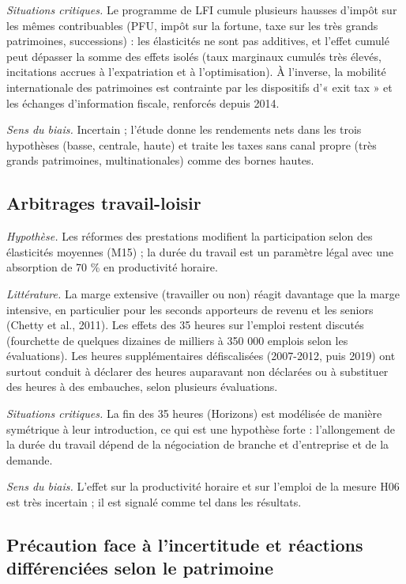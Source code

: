 \documentclass[
  11pt,
  11pt,
  a4paper,
  openany]{book}
\begin{document}
\emph{Situations critiques.} Le programme de LFI cumule plusieurs
hausses d'impôt sur les mêmes contribuables (PFU, impôt sur la fortune,
taxe sur les très grands patrimoines, successions) : les élasticités ne
sont pas additives, et l'effet cumulé peut dépasser la somme des effets
isolés (taux marginaux cumulés très élevés, incitations accrues à
l'expatriation et à l'optimisation). À l'inverse, la mobilité
internationale des patrimoines est contrainte par les dispositifs d'«
exit tax » et les échanges d'information fiscale, renforcés depuis 2014.

\emph{Sens du biais.} Incertain ; l'étude donne les rendements nets dans
les trois hypothèses (basse, centrale, haute) et traite les taxes sans
canal propre (très grands patrimoines, multinationales) comme des bornes
hautes.

\hypertarget{arbitrages-travail-loisir}{%
\subsection{Arbitrages travail-loisir}\label{arbitrages-travail-loisir}}

\emph{Hypothèse.} Les réformes des prestations modifient la
participation selon des élasticités moyennes (M15) ; la durée du travail
est un paramètre légal avec une absorption de 70 \% en productivité
horaire.

\emph{Littérature.} La marge extensive (travailler ou non) réagit
davantage que la marge intensive, en particulier pour les seconds
apporteurs de revenu et les seniors (Chetty et al., 2011). Les effets
des 35 heures sur l'emploi restent discutés (fourchette de quelques
dizaines de milliers à 350 000 emplois selon les évaluations). Les
heures supplémentaires défiscalisées (2007-2012, puis 2019) ont surtout
conduit à déclarer des heures auparavant non déclarées ou à substituer
des heures à des embauches, selon plusieurs évaluations.

\emph{Situations critiques.} La fin des 35 heures (Horizons) est
modélisée de manière symétrique à leur introduction, ce qui est une
hypothèse forte : l'allongement de la durée du travail dépend de la
négociation de branche et d'entreprise et de la demande.

\emph{Sens du biais.} L'effet sur la productivité horaire et sur
l'emploi de la mesure H06 est très incertain ; il est signalé comme tel
dans les résultats.

\hypertarget{pruxe9caution-face-uxe0-lincertitude-et-ruxe9actions-diffuxe9renciuxe9es-selon-le-patrimoine}{%
\subsection{Précaution face à l'incertitude et réactions différenciées
selon le
patrimoine}\label{pruxe9caution-face-uxe0-lincertitude-et-ruxe9actions-diffuxe9renciuxe9es-selon-le-patrimoine}}
\end{document}
